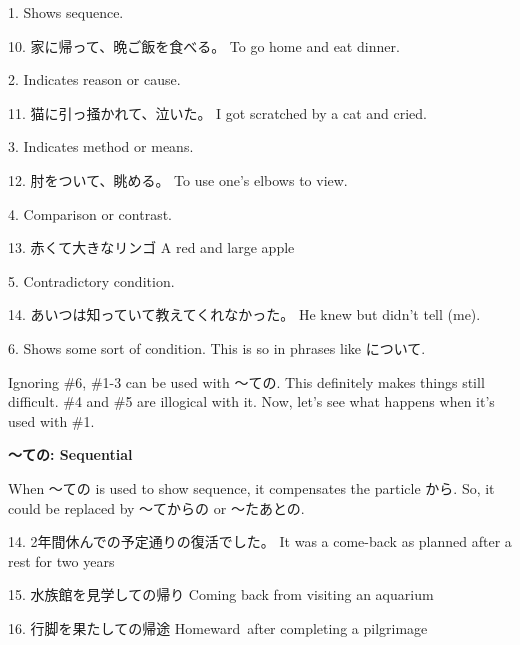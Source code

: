 \par{1. Shows sequence. }

\par{10. 家に帰って、晩ご飯を食べる。 \hfill\break
To go home and eat dinner. }

\par{2. Indicates reason or cause. }

\par{11. 猫に引っ掻かれて、泣いた。 \hfill\break
I got scratched by a cat and cried. }

\par{3. Indicates method or means. }

\par{12. 肘をついて、眺める。 \hfill\break
To use one's elbows to view. }

\par{4. Comparison or contrast. }

\par{13. 赤くて大きなリンゴ \hfill\break
A red and large apple }

\par{5. Contradictory condition. }

\par{14. あいつは知っていて教えてくれなかった。 \hfill\break
He knew but didn't tell (me). }

\par{6. Shows some sort of condition. This is so in phrases like について. }

\par{ Ignoring \#6, \#1-3 can be used with ～ての. This definitely makes things still difficult. \#4 and \#5 are illogical with it. Now, let's see what happens when it's used with \#1. }

\begin{center}
\textbf{～ての: Sequential }
\end{center}

\par{ When ～ての is used to show sequence, it compensates the particle から. So, it could be replaced by ～てからの or ～たあとの. }

\par{14. 2年間休んでの予定通りの復活でした。 \hfill\break
It was a come-back as planned after a rest for two years }

\par{15. 水族館を見学しての帰り \hfill\break
Coming back from visiting an aquarium }

\par{16. 行脚を果たしての帰途 \hfill\break
Homeward after completing a pilgrimage }

